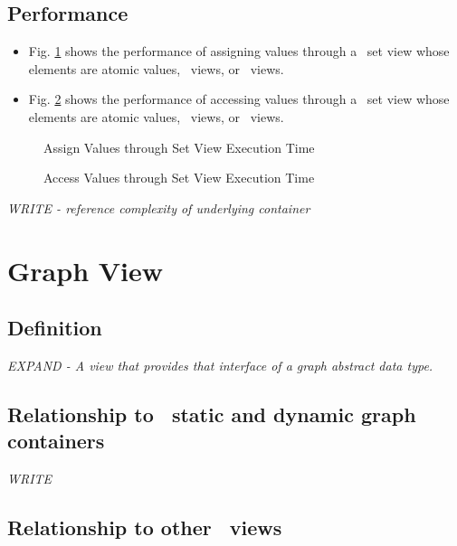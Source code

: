 \subsection{Performance} \label{sec-set-vw-perf}

\begin{itemize}
\item
Fig. \ref{fig:set-vw-assign-exper}
shows the performance of assigning values through a \stapl\ set view
whose elements are atomic values, \stl\ views, or \stapl\ views.
\item
Fig. \ref{fig:set-vw-access-exper}
shows the performance of accessing values through a \stapl\ set view
whose elements are atomic values, \stl\ views, or \stapl\ views.
\end{itemize}

\begin{figure}[p]
\caption{Assign Values through Set View Execution Time}
\label{fig:set-vw-assign-exper}
\end{figure}

\begin{figure}[p]
\caption{Access Values through Set View Execution Time}
\label{fig:set-vw-access-exper}
\end{figure}

\emph{WRITE - reference complexity of underlying container}


\section{Graph View} \label{sec-graf-vw}

\subsection{Definition}

\textit{EXPAND - A view that provides that interface of a graph abstract data type.}

\subsection{Relationship to \stapl\ static and dynamic graph containers}

\textit{WRITE}

\subsection{Relationship to other \stapl\ views}

